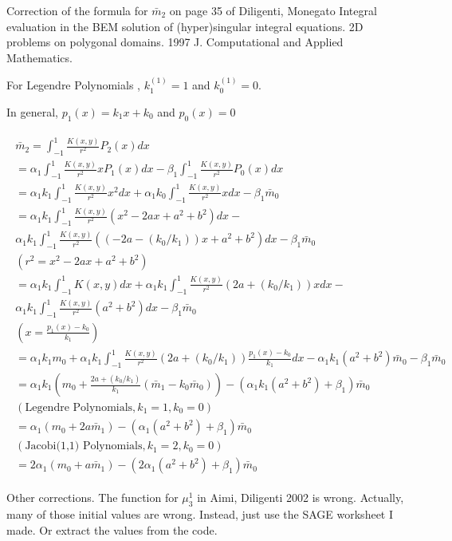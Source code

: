 \documentclass[a4paper,12pt]{article}
\begin{document}
 

Correction of the formula for $\bar{m}_2$ on page 35 of Diligenti, Monegato
Integral evaluation in the BEM solution of (hyper)singular integral 
equations. 2D problems on polygonal domains. 1997 J. Computational and 
Applied Mathematics.

For Legendre Polynomials , $k_1^{(1)} = 1$ and $k_0^{(1)} = 0$.

In general, $p_1(x) = k_1 x + k_0$ and $p_0(x) = 0$

\begin{align}
\begin{split}
    \bar{m}_2 = \int_{-1}^{1} \frac{K(x,y)}{r^2} P_2(x) dx \\
    = \alpha_1 \int_{-1}^{1} \frac{K(x,y)}{r^2} x P_1(x) dx - \beta_1 \int_{-1}^{1} \frac{K(x,y)}{r^2} P_0(x) dx \\
    = \alpha_1 k_1 \int_{-1}^{1} \frac{K(x,y)}{r^2} x^2  dx + \alpha_1 k_0 \int_{-1}^{1} \frac{K(x,y)}{r^2} x  dx - \beta_1 \bar{m}_0   \\
    = \alpha_1 k_1 \int_{-1}^{1} \frac{K(x,y)}{r^2} (x^2 - 2ax + a^2 + b^2) dx - \\
      \alpha_1 k_1 \int_{-1}^{1} \frac{K(x,y)}{r^2} ((-2a - (k_0 / k_1))x + a^2 + b^2)  dx -
      \beta_1 \bar{m}_0 \\
    (r^2 = x^2 - 2ax + a^2 + b^2) \\
    = \alpha_1 k_1 \int_{-1}^{1} K(x,y) dx +
      \alpha_1 k_1 \int_{-1}^{1} \frac{K(x,y)}{r^2} (2a + (k_0 / k_1))x dx -\\
      \alpha_1 k_1 \int_{-1}^{1} \frac{K(x,y)}{r^2} (a^2 + b^2) dx -
      \beta_1 \bar{m}_0 \\
      (x = \frac{p_1(x) - k_0}{k_1})\\
    = \alpha_1 k_1 m_0 +
      \alpha_1 k_1 \int_{-1}^{1} \frac{K(x,y)}{r^2} (2a + (k_0 / k_1))\frac{p_1(x) - k_0}{k_1} dx -
      \alpha_1 k_1 (a^2 + b^2) \bar{m}_0 -
      \beta_1 \bar{m}_0 \\
    = \alpha_1 k_1 (m_0 +
    \frac{2a + (k_0 / k_1)}{k_1} (\bar{m}_1 - k_0 \bar{m}_0)) -  
    (\alpha_1 k_1 (a^2 + b^2) + \beta_1) \bar{m}_0 \\
    (\mbox{Legendre Polynomials}, k_1 = 1, k_0 = 0)\\
    = \alpha_1 (m_0 + 2 a \bar{m}_1) - 
    (\alpha_1(a^2 + b^2) + \beta_1) \bar{m}_0 \\
    (\mbox{Jacobi(1,1) Polynomials}, k_1 = 2, k_0 = 0)\\
    = 2\alpha_1 (m_0 + a \bar{m}_1) - 
    (2\alpha_1(a^2 + b^2) + \beta_1) \bar{m}_0
\end{split}
\end{align}

Other corrections. The function for $\mu_3^1$ in Aimi, Diligenti 2002 is wrong. Actually, many of those initial values are wrong. Instead, just use the SAGE worksheet I made. Or extract the values from the code.
\end{document}
